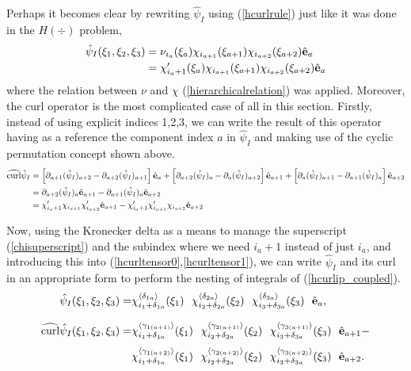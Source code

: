 Perhaps it becomes clear by rewriting $\hat{\psi}_I$ using (\ref{hcurlrule}) just like it was done in the $H(\div)$ problem,
%
\begin{align}
    \hat{\psi}_I(\xi_1,\xi_2,\xi_3)&=\nu_{i_a}(\xi_a)\chi_{i_{a+1}}(\xi_{a+1})\chi_{i_{a+2}}(\xi_{a+2})\hat{\mathbf{e}}_a\nonumber\\
                                   &=\chi_{i_a+1}'(\xi_a)\chi_{i_{a+1}}(\xi_{a+1})\chi_{i_{a+2}}(\xi_{a+2})\hat{\mathbf{e}}_a   \label{hcurltensor0}
\end{align}
%
where the relation between $\nu$ and $\chi$ (\ref{hierarchicalrelation}) was applied. Moreover, the curl operator is the most complicated case of all in this section. Firstly, instead of using explicit indices 1,2,3, we can write the result of this operator having as a reference the component index $a$ in $\hat{\psi}_I$ and making use of the cyclic permutation concept shown above.
% 
\begin{align}
    \widehat{\operatorname{curl}}\hat{\psi}_I&= \left[\partial_{a+1}(\hat{\psi}_I)_{a+2}-\partial_{a+2}(\hat{\psi}_I)_{a+1}\right]\hat{\mathbf{e}}_{a}+  \left[\partial_{a+2}(\hat{\psi}_I)_{a}-\partial_{a}(\hat{\psi}_I)_{a+2}\right]\hat{\mathbf{e}}_{a+1}+ \left[\partial_{a}(\hat{\psi}_I)_{a+1}-\partial_{a+1}(\hat{\psi}_I)_{a}\right]\hat{\mathbf{e}}_{a+2}\nonumber\\
    &=\partial_{a+2}(\hat{\psi}_I)_{a}\hat{\mathbf{e}}_{a+1}-\partial_{a+1}(\hat{\psi}_I)_{a}\hat{\mathbf{e}}_{a+2}\nonumber\\
    &=\chi_{i_a+1}'\chi_{i_{a+1}}\chi_{i_{a+2}}'\hat{\mathbf{e}}_{a+1}-\chi_{i_a+1}'\chi_{i_{a+1}}'\chi_{i_{a+2}}\hat{\mathbf{e}}_{a+2}
    \label{hcurltensor1}
\end{align}

Now, using the Kronecker delta as a means to manage the superscript (\ref{chisuperscript}) and the subindex where we need $i_a+1$ instead of just $i_a$, and introducing this into (\ref{hcurltensor0},\ref{hcurltensor1}), we can write $\hat{\psi}_I$ and its curl in an appropriate form to perform the nesting of integrals of (\ref{hcurlip_coupled}).
% 
\begin{align}
\hat{\psi}_I(\xi_1,\xi_2,\xi_3)=&
\chi_{i_1+\delta_{1a}}^{\langle\delta_{1a}\rangle}(\xi_1)\ \ \chi_{i_2+\delta_{2a}}^{\langle\delta_{2a}\rangle}(\xi_2)\ \ \chi_{i_3+\delta_{3a}}^{\langle\delta_{3a}\rangle}(\xi_3)\ \ \hat{\bfe}_a, \label{curltensor0delta}\\[8pt]
\widehat{\curl}\hat{\psi}_I(\xi_1,\xi_2,\xi_3)=& \chi_{i_1+\delta_{1a}}^{\langle\gamma_{1(a+1)}\rangle}(\xi_1)\ \ \chi_{i_2+\delta_{2a}}^{\langle\gamma_{2(a+1)}\rangle}(\xi_2)\ \ \chi_{i_3+\delta_{3a}}^{\langle\gamma_{3(a+1)}\rangle}(\xi_3)\ \ \hat{\bfe}_{a+1}- \nonumber\\[4pt] &
\chi_{i_1+\delta_{1a}}^{\langle\gamma_{1(a+2)}\rangle}(\xi_1)\ \ \chi_{i_2+\delta_{2a}}^{\langle\gamma_{2(a+2)}\rangle}(\xi_2)\ \ \chi_{i_3+\delta_{3a}}^{\langle\gamma_{3(a+2)}\rangle}(\xi_3)\ \ \hat{\bfe}_{a+2}. \label{curltensor1delta}
\end{align}


